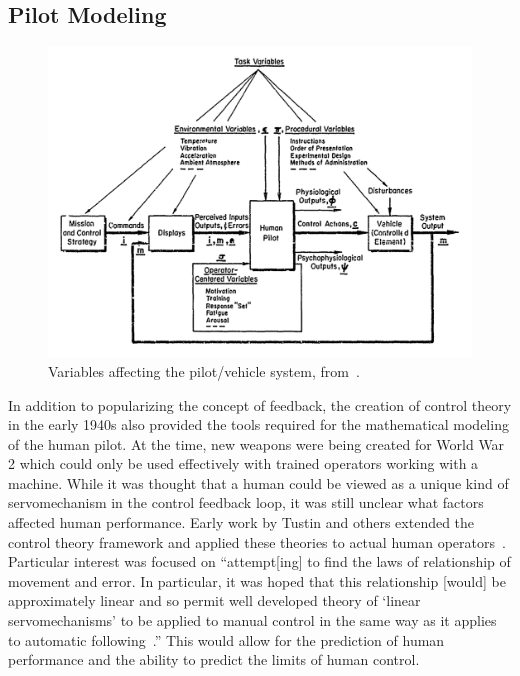 \subsection{Pilot Modeling}
\label{background:pilotmodeling}
\begin{figure}[tb]
    \begin{center}
        \includegraphics[width=0.8\linewidth]{figures/Introduction/Screen_Shot_2018-07-25_at_10_37_08_AM.png}
        \caption[Variables affecting the pilot/vehicle system]{Variables affecting the pilot/vehicle system, from~\citet{mcruer_mathematical_1974}.}
        \label{figure:mcruer1974}
    \end{center}
\end{figure}

In addition to popularizing the concept of feedback, the creation of control theory in the early 1940s also provided the tools required for the mathematical modeling of the human pilot.
At the time, new weapons were being created for World War 2 which could only be used effectively with trained operators working with a machine.
While it was thought that a human could be viewed as a unique kind of servomechanism in the control feedback loop, it was still unclear what factors affected human performance.
Early work by Tustin and others extended the control theory framework and applied these theories to actual human operators~\citep{tustin1944investigation}.
Particular interest was focused on ``attempt[ing] to find the laws of relationship of movement and error. In particular, it was hoped that this relationship [would] be approximately linear and so permit well developed theory of `linear servomechanisms' to be applied to manual control in the same way as it applies to automatic following~\citep{tustin1944investigation}.''
This would allow for the prediction of human performance and the ability to predict the limits of human control.

